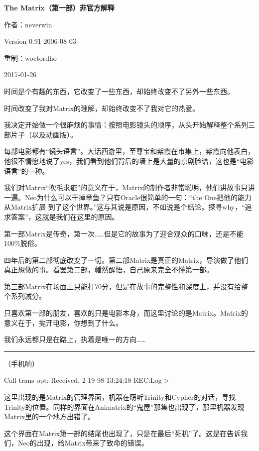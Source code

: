 \documentclass[UTF8]{ctexart}
\newcommand{\myparsep}{\noindent \rule[0.5ex]{\linewidth}{1pt}}
\newenvironment{myquote}{\color{green} \setlength{\leftskip}{6em} \setlength{\rightskip}{4em} \setlength{\parindent}{-2em}}{\par}
\begin{document}
\centerline{\bf \fontsize{15.75pt} \baselineskip \selectfont The Matrix（第一部）非官方解释}
\vspace{12pt}
\centerline{作者：neverwin}
\centerline{Version 0.91 2006-08-03}
\centerline{重制：woctordho}
\centerline{2017-01-26}
\vspace{12pt}

时间是个有趣的东西，它改变了一些东西，却始终改变不了另外一些东西。

时间改变了我对Matrix的理解，却始终改变不了我对它的热爱。

我决定开始做一个很麻烦的事情：按照电影镜头的顺序，从头开始解释整个系列三部片子（以及动画版）。

每部电影都有“镜头语言”。大话西游里，至尊宝和紫霞在市集上，紫霞向他表白，他很不情愿地说了yes，我们看到他们背后的墙上是大量的京剧脸谱，这也是“电影语言”的一种。

我们对Matrix“吹毛求疵”的意义在于，Matrix的制作者非常聪明，他们讲故事只讲一遍。Neo为什么可以干掉章鱼？只有Oracle很简单的一句：“the One把他的能力从Matrix扩展 到了这个世界。”这与其说是原因，不如说是个结论。探寻why，“追求答案”，这就是我们在这里的原因。

第一部Matrix是传奇，第一次……但是它的故事为了迎合观众的口味，还是不能100\%脱俗。

四年后的第二部彻底改变了一切。第二部Matrix是真正的Matrix，导演做了他们真正想做的事。看罢第二部，幡然醒悟，自己原来完全不懂第一部。

第三部Matrix在场面上只能打70分，但是在故事的完整性和深度上，并没有给整个系列减分。

只喜欢第一部的朋友，喜欢的只是电影本身，而这里讨论的是Matrix。Matrix的意义在于，抛开电影，你想到了什么。

我们永远都只是在路上，执着是唯一的方向……

\myparsep

\begin{myquote}
（手机响）

Call trans opt: Received. 2-19-98 13:24:18 REC:Log$>$
\end{myquote}

这里出现的是Matrix的管理界面，机器在窃听Trinity和Cypher的对话，寻找Trinity的位置。同样的界面在Animatrix的“鬼屋”那集也出现了，那里机器发现Matrix里的一个地方出错了。

这个界面在Matrix第一部的结尾也出现了，只是在最后“死机”了。这是在告诉我们，Neo的出现，给Matrix带来了致命的错误。
\end{document}
